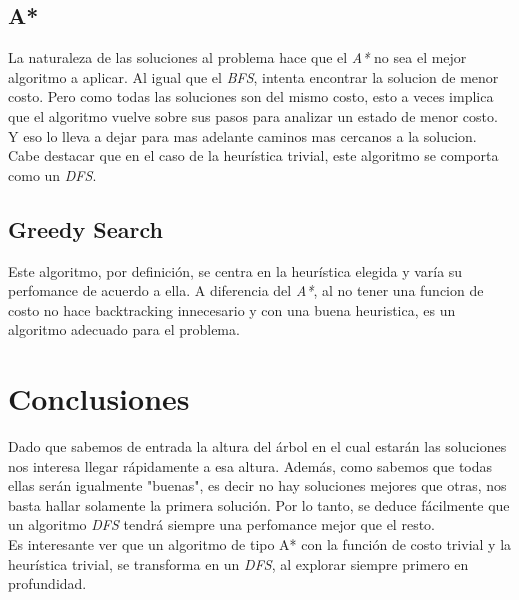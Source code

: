 \documentclass[a4paper,10pt]{article}
\begin{document}
    \subsection{A*}
    
    La naturaleza de las soluciones al problema hace que el \textit{A*} no sea el mejor algoritmo a aplicar. Al igual que el \textit{BFS}, intenta encontrar la solucion de menor costo.
    Pero como todas las soluciones son del mismo costo, esto a veces implica que el algoritmo vuelve sobre sus pasos para analizar un estado de menor costo.
    Y eso lo lleva a dejar para mas adelante caminos mas cercanos a la solucion.
    Cabe destacar que en el caso de la heurística trivial, este algoritmo se comporta como un \textit{DFS}.

    \subsection{Greedy Search}
    
    Este algoritmo, por definición, se centra en la heurística elegida y varía su perfomance de acuerdo a ella.
    A diferencia del \textit{A*}, al no tener una funcion de costo no hace backtracking innecesario y con una buena heuristica, es un algoritmo adecuado para el problema.


\section{Conclusiones}
    Dado que sabemos de entrada la altura del árbol en el cual estarán las soluciones nos interesa llegar rápidamente a esa altura. Además, como sabemos que todas ellas serán 
    igualmente "buenas", es decir no hay soluciones mejores que otras, nos basta hallar solamente la primera solución. Por lo tanto, se deduce fácilmente que un algoritmo 
    \textit{DFS} tendrá siempre una perfomance mejor que el resto. \\

    Es interesante ver que un algoritmo de tipo A* con la función de costo trivial y la heurística trivial, se transforma en un \textit{DFS}, al explorar siempre 
    primero en profundidad. \\
\end{document}
